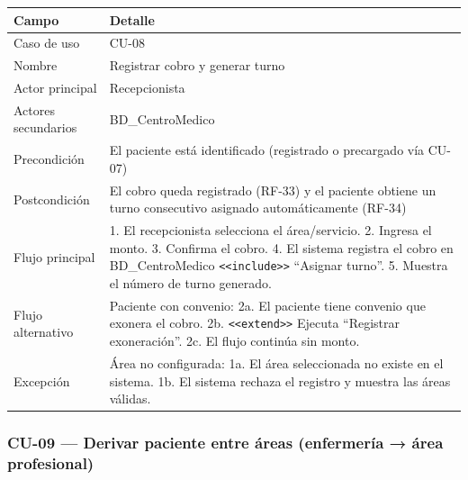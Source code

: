 \documentclass[11pt,a4paper]{article}
\begin{document}
	\begin{longtable}{p{} p{} }
		
		
		\toprule
		\textbf{Campo} &
		\textbf{Detalle}  \\
		\midrule
		\endhead
		
		Caso de uso & CU-08 \\
		Nombre & Registrar cobro y generar turno \\
		Actor principal & Recepcionista \\
		Actores secundarios & BD\_CentroMedico \\
		Precondición & El paciente está identificado (registrado o precargado vía CU-07) \\
		Postcondición & El cobro queda registrado (RF-33) y el paciente obtiene un turno consecutivo asignado automáticamente (RF-34) \\
		Flujo principal & 1. El recepcionista selecciona el área/servicio. 2. Ingresa el monto. 3. Confirma el cobro. 4. El sistema registra el cobro en BD\_CentroMedico \texttt{<<include>>} ``Asignar turno''. 5. Muestra el número de turno generado. \\
		Flujo alternativo & Paciente con convenio: 2a. El paciente tiene convenio que exonera el cobro. 2b. \texttt{<<extend>>} Ejecuta ``Registrar exoneración''. 2c. El flujo continúa sin monto. \\
		Excepción & Área no configurada: 1a. El área seleccionada no existe en el sistema. 1b. El sistema rechaza el registro y muestra las áreas válidas. \\
		\bottomrule
	\end{longtable}
	
	\subsubsection{CU-09 --- Derivar paciente entre áreas (enfermería → área profesional)}
	
\end{document}
